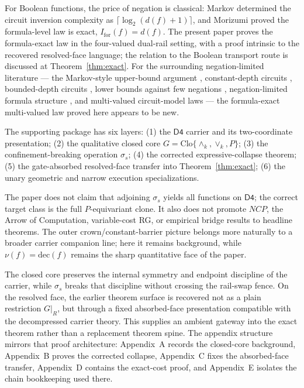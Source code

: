 \documentclass[11pt]{article}
\theoremstyle{remark}
\newcommand{\Dfour}{\ensuremath{\mathsf{D4}}}
\newcommand{\meetk}{\ensuremath{\wedge_k}}
\newcommand{\joink}{\ensuremath{\vee_k}}
\newcommand{\Clo}{\ensuremath{\mathrm{Clo}}}
\newcommand{\dec}{\ensuremath{\mathrm{dec}}}
\begin{document}
For Boolean functions, the price of negation is classical: Markov
\cite{markov} determined the circuit inversion complexity as
$\lceil\log_2(d(f)+1)\rceil$, and Morizumi \cite{morizumi} proved the
formula-level law is exact, $I_{\mathrm{for}}(f)=d(f)$. The present paper
proves the formula-exact law in the four-valued dual-rail setting, with a
proof intrinsic to the recovered resolved-face language; the relation to the
Boolean transport route is discussed at Theorem~\ref{thm:exact}. For the
surrounding negation-limited literature --- the Markov-style upper-bound
argument \cite{fischer}, constant-depth circuits \cite{santha},
bounded-depth circuits \cite{sung}, lower bounds against few negations
\cite{amano}, negation-limited formula structure \cite{guo}, and
multi-valued circuit-model laws \cite{kochergin} --- the formula-exact
multi-valued law proved here appears to be new.

The supporting package has six layers: (1) the \Dfour{} carrier and its
two-coordinate presentation; (2) the qualitative closed core
$G=\Clo\{\meetk,\joink,P\}$; (3) the confinement-breaking operation
$\sigma_s$; (4) the corrected expressive-collapse theorem; (5) the
gate-absorbed resolved-face transfer into Theorem~\ref{thm:exact}; (6) the
unary geometric and narrow execution specializations.

The paper does not claim that adjoining $\sigma_s$ yields all functions on
\Dfour; the correct target class is the full $P$-equivariant clone. It also
does not promote $NCP$, the Arrow of Computation, variable-cost RG, or
empirical bridge results to headline theorems. The outer
crown/constant-barrier picture belongs more naturally to a broader carrier
companion line; here it remains background, while $\nu(f)=\dec(f)$ remains
the sharp quantitative face of the paper.

The closed core preserves the internal symmetry and endpoint discipline of
the carrier, while $\sigma_s$ breaks that discipline without crossing the
rail-swap fence. On the resolved face, the earlier theorem surface is
recovered not as a plain restriction $G|_R$, but through a fixed
absorbed-face presentation compatible with the decompressed carrier theory.
This supplies an ambient gateway into the exact theorem rather than a
replacement theorem spine. The appendix structure mirrors that proof
architecture: Appendix~A records the closed-core background, Appendix~B
proves the corrected collapse, Appendix~C fixes the absorbed-face transfer,
Appendix~D contains the exact-cost proof, and Appendix~E isolates the chain
bookkeeping used there.
\end{document}
